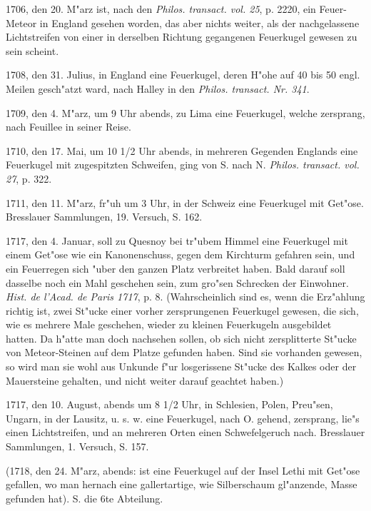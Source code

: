 \documentclass[a4paper, 11pt, oneside, polutonikogreek, german]{article}
\begin{document}
1706, den 20. M"arz ist, nach den \emph{Philos. transact. vol. 25}, p. 2220, ein Feuer-Meteor in England gesehen worden, das aber nichts weiter, als der nachgelassene Lichtstreifen von einer in derselben Richtung gegangenen Feuerkugel gewesen zu sein scheint.

1708, den 31. Julius, in England eine Feuerkugel, deren H"ohe auf 40 bis 50 engl. Meilen gesch"atzt ward, nach Halley in den \emph{Philos. transact. Nr. 341}.

1709, den 4. M"arz, um 9 Uhr abends, zu Lima eine Feuerkugel, welche zersprang, nach Feuillee in seiner Reise.

1710, den 17. Mai, um 10 1/2 Uhr abends, in mehreren Gegenden Englands eine Feuerkugel mit zugespitzten Schweifen, ging von S. nach N. \emph{Philos. transact. vol. 27}, p. 322.

1711, den 11. M"arz, fr"uh um 3 Uhr, in der Schweiz eine Feuerkugel mit Get"ose. Bresslauer Sammlungen, 19. Versuch, S. 162.

1717, den 4. Januar, soll zu Quesnoy bei tr"ubem Himmel eine Feuerkugel mit einem Get"ose wie ein Kanonenschuss, gegen dem Kirchturm gefahren sein, und ein Feuerregen sich "uber den ganzen Platz verbreitet haben. Bald darauf soll dasselbe noch ein Mahl geschehen sein, zum gro"sen Schrecken der Einwohner. \emph{Hist. de l'Acad. de Paris 1717}, p. 8. (Wahrscheinlich sind es, wenn die Erz"ahlung richtig ist, zwei St"ucke einer vorher zersprungenen Feuerkugel gewesen, die sich, wie es mehrere Male geschehen, wieder zu kleinen Feuerkugeln ausgebildet hatten. Da h"atte man doch nachsehen sollen, ob sich nicht zersplitterte St"ucke von Meteor-Steinen auf dem Platze gefunden haben. Sind sie vorhanden gewesen, so wird man sie wohl aus Unkunde f"ur losgerissene St"ucke des Kalkes oder der Mauersteine gehalten, und nicht weiter darauf geachtet haben.)

1717, den 10. August, abends um 8 1/2 Uhr, in Schlesien, Polen, Preu"sen, Ungarn, in der Lausitz, u. s. w. eine Feuerkugel, nach O. gehend, zersprang, lie"s einen Lichtstreifen, und an mehreren Orten einen Schwefelgeruch nach. Bresslauer Sammlungen, 1. Versuch, S. 157.

(1718, den 24. M"arz, abends: ist eine Feuerkugel auf der Insel Lethi mit Get"ose gefallen, wo man hernach eine gallertartige, wie Silberschaum gl"anzende, Masse gefunden hat). S. die 6te Abteilung.
\end{document}
